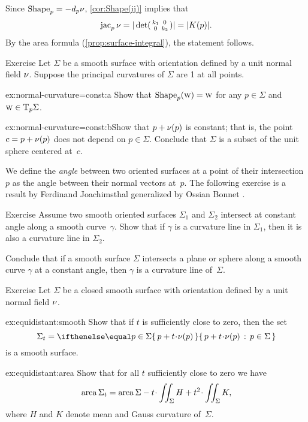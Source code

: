 Since $\mathop{\rm Shape}\nolimits_p=-d_p\nu$, \ref{cor:Shape(ij)} implies that
\[\mathop{\rm jac}\nolimits_p\nu=|\det(\begin{smallmatrix}
 k_1
 &0
 \\
 0
 &k_2
 \end{smallmatrix})|=|K(p)|.\]
By the area formula (\ref{prop:surface-integral}), the statement follows.
\qeds


\begin{thm}{Exercise}\label{ex:normal-curvature=const}
Let $\Sigma$ be a smooth surface with orientation defined by a unit normal field $\nu$.
Suppose the principal curvatures of $\Sigma$ are 1 at all points.

\begin{subthm}{ex:normal-curvature=const:a} Show that $\mathop{\rm Shape}\nolimits_p(\text{\sc{w}})=\text{\sc{w}}$ for any $p\in\Sigma$ and $\text{\sc{w}}\in \mathrm{T}_p\Sigma$.
\end{subthm}

\begin{subthm}{ex:normal-curvature=const:b}Show that $p+\nu(p)$ is constant; that is, the point $c=p+\nu(p)$ does not depend on $p\in\Sigma$.
Conclude that $\Sigma$ is a subset of the unit sphere centered at~$c$.
\end{subthm}

\end{thm}

We define the {}\emph{angle} between two oriented surfaces at a point of their intersection $p$ as the angle between their normal vectors at~$p$.
The following exercise is a result by Ferdinand Joachimsthal \cite{joachimsthal} generalized by Ossian Bonnet \cite{bonnet}.

\begin{thm}{Exercise}\label{ex:shape-curvature-line}
Assume two smooth oriented surfaces $\Sigma_1$ and $\Sigma_2$ intersect at constant angle along a smooth curve~$\gamma$.
Show that if $\gamma$ is a curvature line in $\Sigma_1$, then it is also a curvature line in $\Sigma_2$.

Conclude that if a smooth surface $\Sigma$ intersects a plane or sphere along a smooth curve $\gamma$ at a constant angle,
then $\gamma$ is a curvature line of~$\Sigma$.
\end{thm}

\begin{thm}{Exercise}\label{ex:equidistant}
Let $\Sigma$ be a closed smooth surface with orientation defined by a unit normal field $\nu$.

\begin{subthm}{ex:equidistant:smooth}
Show that if $t$ is sufficiently close to zero, then the set 
\[\Sigma_t=\set{p+t\cdot \Norm(p)}{p\in\Sigma}\] 
is a smooth surface.
\end{subthm}

\begin{subthm}{ex:equidistant:area}
Show that for all $t$ sufficiently close to zero we have
\[\area\Sigma_t=\area\Sigma-t\cdot \iint_\Sigma H+t^2\cdot \iint_\Sigma K,\]
where $H$ and $K$ denote mean and Gauss curvature of~$\Sigma$.
\end{subthm}

\end{thm}


